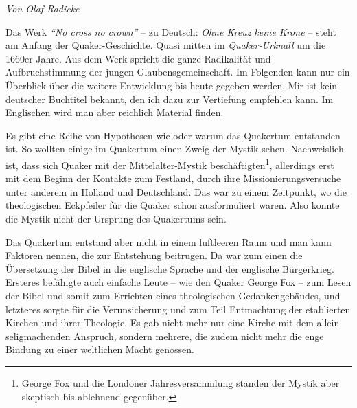 


\begin{flushright}
\begin{footnotesize}
\textit{Von Olaf Radicke}
\end{footnotesize}
\end{flushright}
\smallskip

Das Werk \textit{"`No cross no crown"'} -- zu Deutsch: \textit{Ohne Kreuz keine
Krone} --
steht am Anfang der Quaker-Geschichte. Quasi mitten im
\textit{Quaker-Urknall}
um die 1660er Jahre. Aus dem Werk spricht die ganze Radikalität und
Aufbruchstimmung der jungen Glaubensgemeinschaft. Im Folgenden kann nur ein
Überblick über die weitere Entwicklung bis heute gegeben werden. Mir ist kein
deutscher Buchtitel bekannt, den ich dazu zur Vertiefung empfehlen kann. Im
Englischen wird man aber reichlich Material finden.

\medskip

Es gibt eine Reihe von Hypothesen wie oder warum das Quakertum
entstanden ist.
So
wollten einige im Quakertum einen Zweig der Mystik sehen.
Nachweislich ist, dass
sich Quaker mit der Mittelalter-Mystik beschäftigten\footnote{George Fox und die
Londoner Jahresversammlung standen der Mystik aber skeptisch bis ablehnend
gegenüber.}, allerdings erst mit dem
Beginn der Kontakte zum Festland, durch ihre Missionierungsversuche unter
anderem in Holland und Deutschland. Das war zu einem Zeitpunkt, wo die
theologischen Eckpfeiler für die Quaker schon ausformuliert waren. Also konnte
die Mystik nicht der Ursprung des Quakertums sein.

\medskip

Das Quakertum entstand aber nicht in einem luftleeren Raum und man kann Faktoren
nennen,
die zur Entstehung beitrugen. Da war zum einen die Übersetzung der Bibel
in die englische Sprache und der englische Bürgerkrieg. Ersteres befähigte auch
einfache Leute -- wie den Quaker George Fox -- zum
Lesen der Bibel und somit zum
Errichten eines theologischen Gedankengebäudes, und letzteres sorgte für die
Verunsicherung und zum Teil Entmachtung der etablierten Kirchen und ihrer
Theologie. Es gab nicht mehr nur eine Kirche mit dem allein seligmachenden
Anspruch, sondern mehrere, die zudem nicht mehr die enge Bindung zu einer
weltlichen Macht genossen.

\medskip

